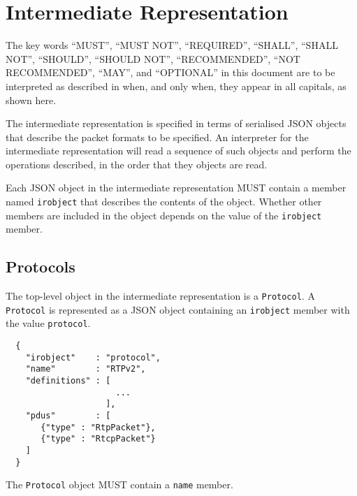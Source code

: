 \documentclass[twocolumn,a4paper]{article}
\begin{document}


\section{Intermediate Representation}

The key words ``MUST'', ``MUST NOT'', ``REQUIRED'', ``SHALL'', ``SHALL
NOT'', ``SHOULD'', ``SHOULD NOT'', ``RECOMMENDED'', ``NOT RECOMMENDED'',
``MAY'', and ``OPTIONAL'' in this document are to be interpreted as
described in \cite{RFC2119,RFC8174} when, and only when, they appear
in all capitals, as shown here.



The intermediate representation is specified in terms of serialised JSON
\cite{RFC7159} objects that describe the packet formats to be specified.
An interpreter for the intermediate representation will read a sequence of
such objects and perform the operations described, in the order that they
objects are read.

Each JSON object in the intermediate representation MUST contain a member
named \texttt{irobject} that describes the contents of the object.
Whether other members are included in the object depends on the value of
the \texttt{irobject} member.

\subsection{Protocols}

The top-level object in the intermediate representation is a
\texttt{Protocol}. A \texttt{Protocol} is represented as a JSON object
containing an \texttt{irobject} member with the value \texttt{protocol}.

\begin{verbatim}
  {
    "irobject"    : "protocol",
    "name"        : "RTPv2",
    "definitions" : [
                      ...
                    ],
    "pdus"        : [
       {"type" : "RtpPacket"},
       {"type" : "RtcpPacket"}
    ]
  }
\end{verbatim}

The \texttt{Protocol} object MUST contain a \texttt{name} member.
\end{document}
